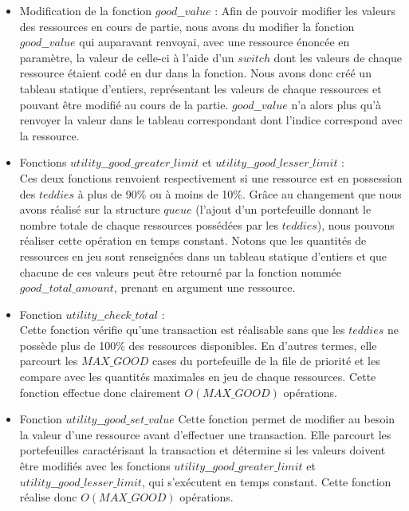 \documentclass{article}
\begin{document}
\begin{itemize}
    \item Modification de la fonction $good\_\_value$ :
    Afin de pouvoir modifier les valeurs des ressources en cours de partie, nous avons du modifier la fonction $good\_\_value$ qui auparavant renvoyai, avec une ressource énoncée en paramètre, la valeur de celle-ci à l'aide d'un $switch$ dont les valeurs de chaque ressource étaient codé en dur dans la fonction. Nous avons donc créé un tableau statique d'entiers, représentant les valeurs de chaque ressources et pouvant être modifié au cours de la partie. $good\_\_value$ n'a alors plus qu'à renvoyer la valeur dans le tableau correspondant dont l'indice correspond avec la ressource.
    
    \item Fonctions $utility\_\_good\_greater\_limit$ et $utility\_\_good\_lesser\_limit$ : \\ 
    Ces deux fonctions renvoient respectivement si une ressource est en possession des $teddies$ à plus de 90\% ou à moins de 10\%. Grâce au changement que nous avons réalisé sur la structure $queue$ (l'ajout d'un portefeuille donnant le nombre totale de chaque ressources possédées par les $teddies$), nous pouvons réaliser cette opération en temps constant. Notons que les quantités de ressources en jeu sont renseignées dans un tableau statique d'entiers et que chacune de ces valeurs peut être retourné par la fonction nommée $good\_\_total\_amount$, prenant en argument une ressource. 
    
    \item Fonction $utility\_\_check\_total$ : \\
    Cette fonction vérifie qu'une transaction est réalisable sans que les $teddies$ ne possède plus de 100\% des ressources disponibles. En d'autres termes, elle parcourt les $MAX\_GOOD$ cases du portefeuille de la file de priorité et les compare avec les quantités maximales en jeu de chaque ressources. Cette fonction effectue donc clairement $O(MAX\_GOOD)$ opérations.
    
    \item Fonction $utility\_\_good\_set\_value$
    Cette fonction permet de modifier au besoin la valeur d'une ressource avant d'effectuer une transaction. Elle parcourt les portefeuilles caractérisant la transaction et détermine si les valeurs doivent être modifiés avec les fonctions $utility\_\_good\_greater\_limit$ et $utility\_\_good\_lesser\_limit$, qui s'exécutent en temps constant. Cette fonction réalise donc $O(MAX\_GOOD)$ opérations. 
\end{itemize}
\end{document}
